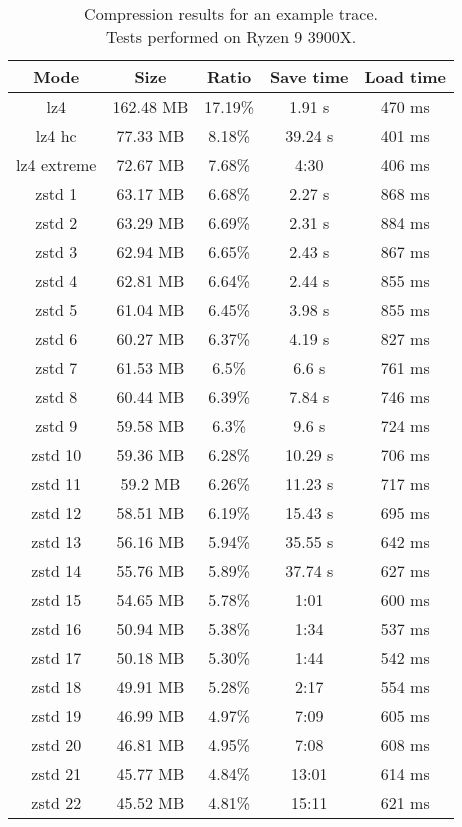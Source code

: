 \documentclass[hidelinks,titlepage,a4paper,twoside]{article}
\begin{document}
\begin{table}
\centering
\begin{tabular}[h]{c|c|c|c|c}
\textbf{Mode} & \textbf{Size} & \textbf{Ratio} & \textbf{Save time} & \textbf{Load time} \\ \hline
lz4 & 162.48 MB & 17.19\% & 1.91 \si{\second} & 470 \si{\milli\second} \\
lz4 hc & 77.33 MB & 8.18\% & 39.24 \si{\second} & 401 \si{\milli\second} \\
lz4 extreme & 72.67 MB & 7.68\% & 4:30 & 406 \si{\milli\second} \\ \hline
zstd 1 & 63.17 MB & 6.68\% & 2.27 \si{\second} & 868 \si{\milli\second} \\
zstd 2 & 63.29 MB & 6.69\% & 2.31 \si{\second} & 884 \si{\milli\second} \\
zstd 3 & 62.94 MB & 6.65\% & 2.43 \si{\second} & 867 \si{\milli\second} \\
zstd 4 & 62.81 MB & 6.64\% & 2.44 \si{\second} & 855 \si{\milli\second} \\
zstd 5 & 61.04 MB & 6.45\% & 3.98 \si{\second} & 855 \si{\milli\second} \\
zstd 6 & 60.27 MB & 6.37\% & 4.19 \si{\second} & 827 \si{\milli\second} \\
zstd 7 & 61.53 MB & 6.5\% & 6.6 \si{\second} & 761 \si{\milli\second} \\
zstd 8 & 60.44 MB & 6.39\% & 7.84 \si{\second} & 746 \si{\milli\second} \\
zstd 9 & 59.58 MB & 6.3\% & 9.6 \si{\second} & 724 \si{\milli\second} \\
zstd 10 & 59.36 MB & 6.28\% & 10.29 \si{\second} & 706 \si{\milli\second} \\
zstd 11 & 59.2 MB & 6.26\% & 11.23 \si{\second} & 717 \si{\milli\second} \\
zstd 12 & 58.51 MB & 6.19\% & 15.43 \si{\second} & 695 \si{\milli\second} \\
zstd 13 & 56.16 MB & 5.94\% & 35.55 \si{\second} & 642 \si{\milli\second} \\
zstd 14 & 55.76 MB & 5.89\% & 37.74 \si{\second} & 627 \si{\milli\second} \\
zstd 15 & 54.65 MB & 5.78\% & 1:01 & 600 \si{\milli\second} \\
zstd 16 & 50.94 MB & 5.38\% & 1:34 & 537 \si{\milli\second} \\
zstd 17 & 50.18 MB & 5.30\% & 1:44 & 542 \si{\milli\second} \\
zstd 18 & 49.91 MB & 5.28\% & 2:17 & 554 \si{\milli\second} \\
zstd 19 & 46.99 MB & 4.97\% & 7:09 & 605 \si{\milli\second} \\
zstd 20 & 46.81 MB & 4.95\% & 7:08 & 608 \si{\milli\second} \\
zstd 21 & 45.77 MB & 4.84\% & 13:01 & 614 \si{\milli\second} \\
zstd 22 & 45.52 MB & 4.81\% & 15:11 & 621 \si{\milli\second}
\end{tabular}
\caption{Compression results for an example trace. \\ Tests performed on Ryzen 9 3900X.}
\label{compressiontimes}
\end{table}
\end{document}
